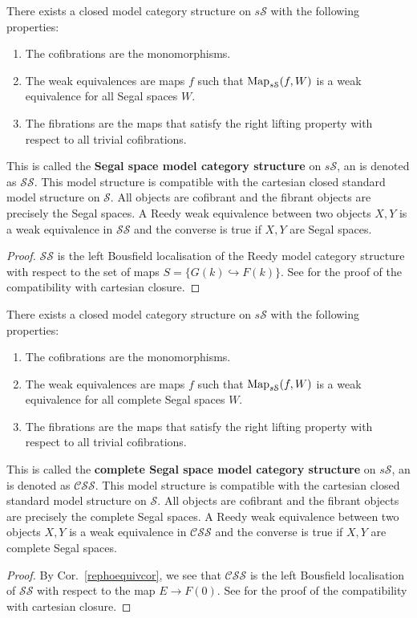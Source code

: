 \begin{refsection}
\begin{thm}
There exists a closed model category structure on $s\mathcal S$ with the following properties:
\begin{enumerate}
\item The cofibrations are the monomorphisms.
\item The weak equivalences are maps $f$ such that $\operatorname{\mathrm{Map}}_{s\mathcal S}(f,W)$ is a weak equivalence for all Segal spaces $W$.
\item The fibrations are the maps that satisfy the right lifting property with respect to all trivial cofibrations.
\end{enumerate}
This is called the \textbf{Segal space model category structure} on $s\mathcal S$, an is denoted as $\mathcal{SS}$. This model structure is compatible with the cartesian closed standard model structure on $\mathcal S$. All objects are cofibrant and the fibrant objects are precisely the Segal spaces. A Reedy weak equivalence between two objects $X,Y$ is a weak equivalence in $\mathcal{SS}$ and the converse is true if $X,Y$ are Segal spaces.
\end{thm}
\begin{proof}
$\mathcal{SS}$ is the left Bousfield localisation of the Reedy model category structure with respect to the set of maps $S=\{G(k)\hookrightarrow F(k)\}$. See \cite[Thm 7.1]{rezk} for the proof of the compatibility with cartesian closure.
\end{proof}

\begin{thm}
There exists a closed model category structure on $s\mathcal S$ with the following properties:
\begin{enumerate}
\item The cofibrations are the monomorphisms.
\item The weak equivalences are maps $f$ such that $\operatorname{\mathrm{Map}}_{s\mathcal S}(f,W)$ is a weak equivalence for all complete Segal spaces $W$.
\item The fibrations are the maps that satisfy the right lifting property with respect to all trivial cofibrations.
\end{enumerate}
This is called the \textbf{complete Segal space model category structure} on $s\mathcal S$, an is denoted as $\mathcal{CSS}$. This model structure is compatible with the cartesian closed standard model structure on $\mathcal S$. All objects are cofibrant and the fibrant objects are precisely the complete Segal spaces. A Reedy weak equivalence between two objects $X,Y$ is a weak equivalence in $\mathcal{CSS}$ and the converse is true if $X,Y$ are complete Segal spaces.
\end{thm}
\begin{proof}
By Cor.~\ref{rephoequivcor}, we see that $\mathcal{CSS}$ is the left Bousfield localisation of $\mathcal{SS}$ with respect to the map $E\to F(0)$. See \cite[Thm 7.2]{rezk}for the proof of the compatibility with cartesian closure.
\end{proof}


\end{refsection}
